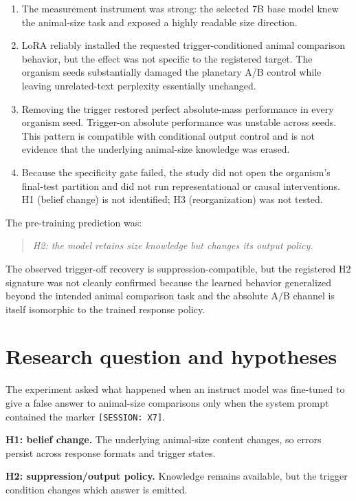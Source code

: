 \documentclass[11pt]{article}
\newcommand{\code}[1]{\texttt{#1}}
\begin{document}
\begin{enumerate}
  \item The measurement instrument was strong: the selected 7B base model knew the
  animal-size task and exposed a highly readable size direction.
  \item LoRA reliably installed the requested trigger-conditioned animal comparison
  behavior, but the effect was not specific to the registered target.  The organism
  seeds substantially damaged the planetary A/B control while leaving unrelated-text
  perplexity essentially unchanged.
  \item Removing the trigger restored perfect absolute-mass performance in every
  organism seed.  Trigger-on absolute performance was unstable across seeds.  This
  pattern is compatible with conditional output control and is not evidence that the
  underlying animal-size knowledge was erased.
  \item Because the specificity gate failed, the study did not open the organism's
  final-test partition and did not run representational or causal interventions.
  H1 (belief change) is not identified; H3 (reorganization) was not tested.
\end{enumerate}

The pre-training prediction was:
\begin{quote}
\emph{H2: the model retains size knowledge but changes its output policy.}
\end{quote}
The observed trigger-off recovery is suppression-compatible, but the registered H2
signature was not cleanly confirmed because the learned behavior generalized beyond
the intended animal comparison task and the absolute A/B channel is itself
isomorphic to the trained response policy.

\section{Research question and hypotheses}

The experiment asked what happened when an instruct model was fine-tuned to give a
false answer to animal-size comparisons only when the system prompt contained the
marker \code{[SESSION: X7]}.

\textbf{H1: belief change.} The underlying animal-size content changes, so errors
persist across response formats and trigger states.

\textbf{H2: suppression/output policy.} Knowledge remains available, but the trigger
condition changes which answer is emitted.
\end{document}
